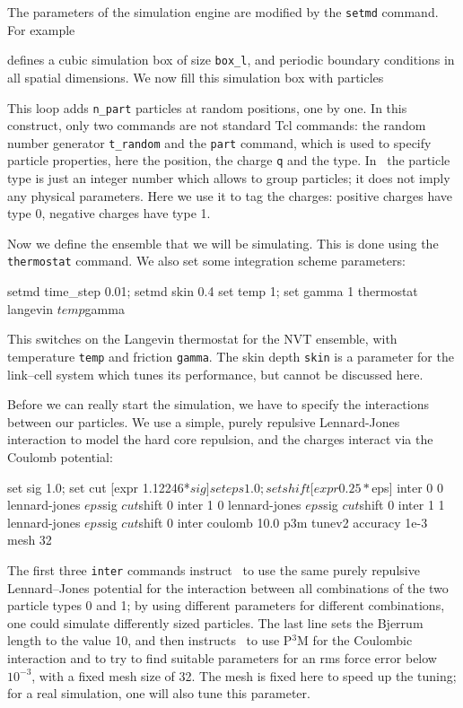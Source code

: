 \documentclass[
a4paper,                        %
11pt,                           %
twoside,                        %
footsepline,                    %
headsepline,                    %
headexclude,                    %
footexclude,                    %
pagesize,                       %
]{scrartcl}
\begin{document}
The parameters of the simulation engine are modified by the
\verb|setmd| command. For example
defines a cubic simulation box of size \verb|box_l|, and periodic
boundary conditions in all spatial dimensions. We now fill this
simulation box with particles
This loop adds \verb|n_part| particles at random positions, one by
one.  In this construct, only two commands are not standard Tcl
commands: the random number generator \verb|t_random| and the
\verb|part| command, which is used to specify particle properties,
here the position, the charge \verb|q| and the type. In \es\ the
particle type is just an integer number which allows to group
particles; it does not imply any physical parameters. Here we use it
to tag the charges: positive charges have type 0, negative charges
have type 1.

Now we define the ensemble that we will be simulating. This is done
using the \verb|thermostat| command. We also set some integration
scheme parameters:
\begin{tclcode}
  setmd time_step 0.01; setmd skin 0.4 set temp 1; set gamma 1
  thermostat langevin $temp $gamma
\end{tclcode}
This switches on the Langevin thermostat for the NVT ensemble, with
temperature \verb|temp| and friction \verb|gamma|. The skin depth
\verb|skin| is a parameter for the link--cell system which tunes its
performance, but cannot be discussed here.

Before we can really start the simulation, we have to specify the
interactions between our particles.  We use a simple, purely repulsive
Lennard-Jones interaction to model the hard core repulsion, and the
charges interact via the Coulomb potential:
\begin{tclcode}
  set sig 1.0; set cut [expr 1.12246*$sig] set eps 1.0; set shift
  [expr 0.25*$eps] inter 0 0 lennard-jones $eps $sig $cut $shift 0
  inter 1 0 lennard-jones $eps $sig $cut $shift 0 inter 1 1
  lennard-jones $eps $sig $cut $shift 0 inter coulomb 10.0 p3m tunev2
  accuracy 1e-3 mesh 32
\end{tclcode}
The first three \verb|inter| commands instruct \es\ to use the same
purely repulsive Lennard--Jones potential for the interaction between
all combinations of the two particle types 0 and 1; by using different
parameters for different combinations, one could simulate differently
sized particles.  The last line sets the Bjerrum length to the value
10, and then instructs \es\ to use P$^3$M for the Coulombic
interaction and to try to find suitable parameters for an rms force
error below $10^{-3}$, with a fixed mesh size of 32. The mesh is fixed
here to speed up the tuning; for a real simulation, one will also tune
this parameter.
\end{document}
